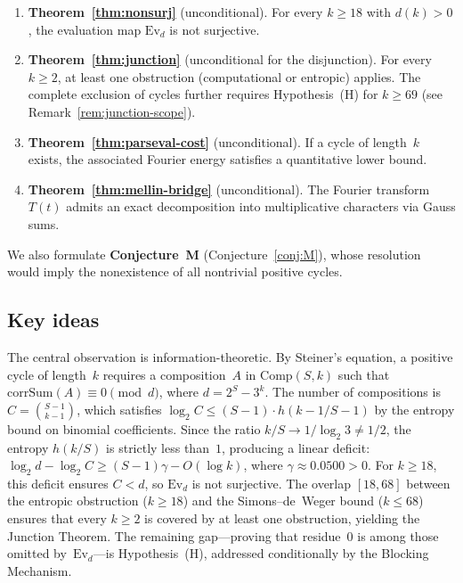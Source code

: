 \documentclass[12pt, a4paper]{amsart}
\theoremstyle{plain}
\theoremstyle{definition}
\theoremstyle{remark}
\newcommand{\Comp}{\mathrm{Comp}}
\newcommand{\Ev}{\mathrm{Ev}}
\newcommand{\corrSum}{\mathrm{corrSum}}
\begin{document}
\begin{enumerate}[label=(\roman*)]
  \item \textbf{Theorem~\ref{thm:nonsurj}} (unconditional).
    For every $k \geq 18$ with $d(k) > 0$,
    the evaluation map $\Ev_d$ is not surjective.
  \item \textbf{Theorem~\ref{thm:junction}} (unconditional
    for the disjunction).
    For every $k \geq 2$, at least one obstruction
    (computational or entropic) applies.
    The complete exclusion of cycles further requires
    Hypothesis~(H) for $k \geq 69$
    (see Remark~\ref{rem:junction-scope}).
  \item \textbf{Theorem~\ref{thm:parseval-cost}} (unconditional).
    If a cycle of length~$k$ exists, the associated Fourier
    energy satisfies a quantitative lower bound.
  \item \textbf{Theorem~\ref{thm:mellin-bridge}} (unconditional).
    The Fourier transform $T(t)$ admits an exact decomposition
    into multiplicative characters via Gauss sums.
\end{enumerate}

We also formulate \textbf{Conjecture~M}
(Conjecture~\ref{conj:M}),
whose resolution would imply the nonexistence of all
nontrivial positive cycles.

\subsection{Key ideas}

The central observation is information-theoretic.
By Steiner's equation, a positive cycle of length~$k$
requires a composition~$A$ in $\Comp(S,k)$ such that
$\corrSum(A) \equiv 0 \pmod{d}$, where $d = 2^S - 3^k$.
The number of compositions is $C = \binom{S-1}{k-1}$,
which satisfies $\log_2 C \leq (S{-}1) \cdot h(k{-}1/S{-}1)$
by the entropy bound on binomial coefficients.
Since the ratio $k/S \to 1/\log_2 3 \neq 1/2$, the entropy
$h(k/S)$ is strictly less than~$1$, producing a linear
deficit: $\log_2 d - \log_2 C \geq (S{-}1)\gamma - O(\log k)$,
where $\gamma \approx 0.0500 > 0$.
For $k \geq 18$, this deficit ensures $C < d$, so $\Ev_d$
is not surjective.
The overlap $[18, 68]$ between the entropic obstruction
($k \geq 18$) and the Simons--de~Weger bound ($k \leq 68$)
ensures that every $k \geq 2$ is covered by at least one
obstruction, yielding the Junction Theorem.
The remaining gap---proving that residue~$0$ is among
those omitted by~$\Ev_d$---is Hypothesis~(H),
addressed conditionally by the Blocking Mechanism.
\end{document}
